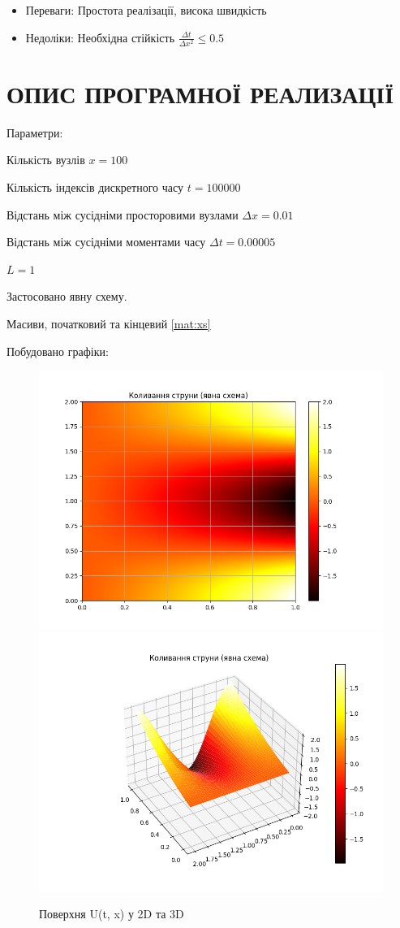 \documentclass{article}
\begin{document}
\begin{enumerate}
                \begin{itemize}
                    \item Переваги: Простота реалізації, висока швидкість
                    \item Недоліки: Необхідна стійкість $ \frac{\Delta{t}}{\Delta{x}^2} \leq 0.5 $
                \end{itemize}
        \end{enumerate}

    \newpage
    \section{ОПИС ПРОГРАМНОЇ РЕАЛИЗАЦІЇ}
        Параметри:

        Кількість вузлів $ x = 100 $
        
        Кількість індексів дискретного часу $ t = 100 000 $
        
        Відстань між сусідніми просторовими вузлами $ \Delta{x} = 0.01 $
        
        Відстань між сусідніми моментами часу $ \Delta{t} = 0.00005 $

        $ L = 1 $

        Застосовано явну схему.

        Масиви, початковий та кінцевий \eqref{mat:xs}

        Побудовано графіки:

        \begin{figure}[h!]
            \includegraphics[width=0.5\linewidth]{straight_2d.png}
            \includegraphics[width=0.5\linewidth]{straight_3d.png}
            \caption{Поверхня U(t, x) у 2D та 3D}
        \end{figure}
\end{document}
